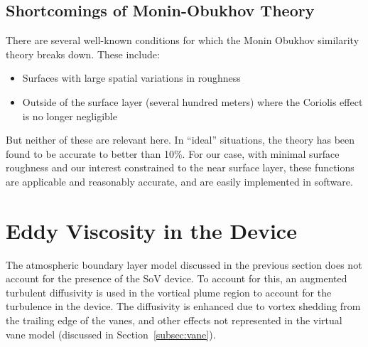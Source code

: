 \subsection{Shortcomings of Monin-Obukhov Theory}

There are several well-known conditions for which the Monin
Obukhov similarity theory breaks down. These include:
 
\begin{itemize}
 \item Surfaces with large spatial variations in roughness
 \item Outside of the surface layer (several hundred meters) where the 
       Coriolis effect is no longer negligible
\end{itemize}

But neither of these are relevant here. 
In ``ideal'' situations, the theory has been found to be
accurate to better than 10\%\cite{QJ:QJ49709741204,kaimal}. 
For our case, with minimal surface roughness and our interest
constrained to the near surface layer, these functions are applicable
and reasonably accurate\cite{Foken2006}, and are easily implemented in
software.  

\section{Eddy Viscosity in the Device}

The atmospheric boundary layer model discussed in the previous section
does not account for the presence of the SoV device.
To account for this, an augmented turbulent diffusivity 
is used in the vortical plume region to account for the turbulence 
in the device. The diffusivity is enhanced due to vortex shedding from the 
trailing edge of the vanes, and other effects not 
represented in the virtual vane model (discussed in Section~\ref{subsec:vane}). 


